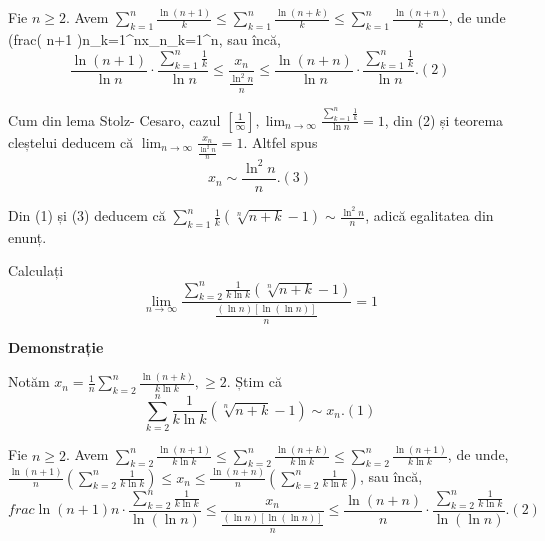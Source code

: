 \documentclass[a4paper,12pt,oneside]{report}
\begin{document}
Fie \(n\geq 2\). Avem \(\sum_{k=1}^{n}\frac{\ln\left ( n+1 \right )}{k}\leq \sum_{k=1}^{n}\frac{\ln\left ( n+k \right )}{k}\leq \sum_{k=1}^{n}\frac{\ln\left ( n+n \right )}{k}\), de unde 
\\(frac{\ln \left ( n+1 \right )}{n}\sum_{k=1}^{n}\leq x_{n}\leq {}\sum_{k=1}^{n}\), sau încă, 
\begin{displaymath}
  \frac{\ln \left ( n+1 \right )}{\ln n}\cdot \frac{\sum_{k=1}^{n}\frac{1}{k}}{\ln n}\leq \frac{x_{n}}{\frac{\ln^{2}n}{n}}\leq \frac{\ln \left ( n+n \right )}{\ln n}\cdot \frac{\sum_{k=1}^{n}\frac{1}{k}}{\ln n }. (2)
\end{displaymath}

Cum din lema Stolz- Cesaro, cazul \(\left [ \frac{1}{\infty } \right ], \lim_{n \to \infty }\frac{\sum_{k=1}^{n}\frac{1}{k}}{\ln n} = 1\), din (2) și teorema cleștelui deducem că \(\lim_{n \to \infty }\frac{x_{n}}{\frac{\ln ^{2}n}{n}} = 1\). 
Altfel spus 
\begin{displaymath}
  x_{n}\sim \frac{\ln^{2}n}{n}. (3)
\end{displaymath}


Din (1) și (3) deducem că \(\sum_{k=1}^{n}\frac{1}{k}\left ( \sqrt[n]{n+k}-1 \right )\sim \frac{\ln^{2}n}{n}\), adică egalitatea din enunț. 

Calculați 
\begin{displaymath}
  \lim_{n \to \infty }\frac{\sum_{k=2}^{n}\frac{1}{k \ln k}\left ( \sqrt[n]{n+k}-1 \right )}{\frac{\left ( \ln n \right )\left [ \ln \left ( \ln n  \right ) \right ]}{n}} = 1
\end{displaymath}


\textbf{Demonstrație}
 
Notăm \(x_{n} = \frac{1}{n}\sum_{k=2}^{n}\frac{\ln \left ( n+k \right )}{k \ln k}, \geq 2.\)
Știm că 
\begin{displaymath}
  \sum_{k=2}^{n}\frac{1}{k\ln k}\left ( \sqrt[n]{n+k}-1 \right )\sim x_{n} . (1)
\end{displaymath}

Fie \(n\geq 2\). Avem \(\sum_{k=2}^{n}\frac{\ln \left ( n+1 \right )}{k\ln k}\leq \sum_{k=2}^{n}\frac{\ln \left ( n+k \right )}{k\ln k}\leq \sum_{k=2}^{n}\frac{\ln \left ( n+1 \right )}{k\ln k}\), de unde, 
\(\frac{\ln \left ( n+1 \right )}{n}\left ( \sum_{k=2}^{n}\frac{1}{k\ln k } \right )\leq x_{n}\leq \frac{\ln \left ( n+n \right )}{n}\left ( \sum_{k=2}^{n}\frac{1}{k\ln k } \right )\), sau încă, 
\begin{displaymath}
  frac{\ln \left ( n+1 \right )}{n}\cdot \frac{\sum_{k=2}^{n}\frac{1}{k\ln k }}{\ln \left ( \ln n \right )}\leq \frac{x_{n}}{\frac{\left ( \ln n \right )\left [ \ln\left ( \ln n \right ) \right ]}{n}}\leq \frac{\ln \left ( n+n \right )}{n}\cdot \frac{\sum_{k=2}^{n}\frac{1}{k\ln k }}{\ln \left ( \ln n \right )}. (2)
\end{displaymath}
\end{document}
